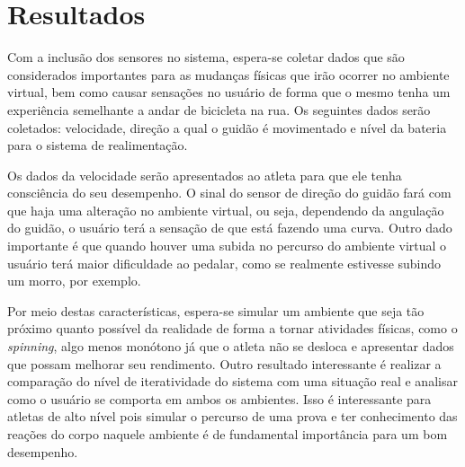 \chapter[Resultados]{Resultados}

Com a inclusão dos sensores no sistema, espera-se coletar dados que são considerados importantes para as mudanças físicas que irão ocorrer no ambiente virtual, bem como causar sensações no usuário de forma que o mesmo tenha um experiência semelhante a andar de bicicleta na rua. Os seguintes dados serão coletados: velocidade, direção a qual o guidão é movimentado e nível da bateria para o sistema de realimentação.

Os dados da velocidade serão apresentados ao atleta para que ele tenha consciência do seu desempenho. O sinal do sensor de direção do guidão fará com que haja uma alteração no ambiente virtual, ou seja, dependendo da angulação do guidão, o usuário terá a sensação de que está fazendo uma curva. Outro dado importante é que quando houver uma subida no percurso do ambiente virtual o usuário terá maior dificuldade ao pedalar, como se realmente estivesse subindo um morro, por exemplo.

Por meio destas características, espera-se simular um ambiente que seja tão próximo quanto possível da realidade de forma a tornar atividades físicas, como o \textit{spinning}, algo menos monótono já que o atleta não se desloca e apresentar dados que possam melhorar seu rendimento. Outro resultado interessante é realizar a comparação do nível de iteratividade do sistema com uma situação real e analisar como o usuário se comporta em ambos os ambientes. Isso é interessante para atletas de alto nível pois simular o percurso de uma prova e ter conhecimento das reações do corpo naquele ambiente é de fundamental importância para um bom desempenho.

